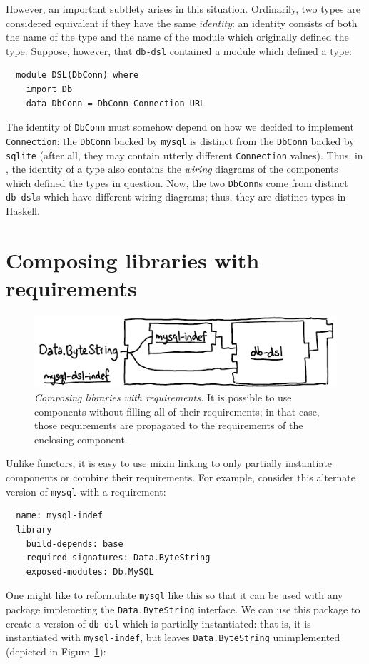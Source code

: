 However, an important subtlety arises in
this situation.  Ordinarily, two types are considered equivalent if they
have the same \emph{identity}: an identity consists of both the name of the
type and the name of the module which originally defined the type.
Suppose, however, that \verb|db-dsl| contained a module which defined
a type:

\begin{verbatim}
  module DSL(DbConn) where
    import Db
    data DbConn = DbConn Connection URL
\end{verbatim}
%
The identity of \verb|DbConn| must somehow depend on how
we decided to implement \verb|Connection|: the \verb|DbConn| backed by
\verb|mysql| is distinct from the \verb|DbConn| backed by \verb|sqlite|
(after all, they may contain utterly different \verb|Connection| values).
Thus, in \Backpack{}, the identity of a type
also contains the \emph{wiring} diagrams of the components which
defined the types in question.  Now, the two \verb|DbConn|s come from
distinct \verb|db-dsl|s which have different wiring diagrams;
thus, they are distinct types in Haskell.

\section{Composing libraries with requirements}

\begin{figure}
\includegraphics{diagrams/composing-requirements.pdf}
\caption{\emph{Composing libraries with requirements.} It is possible
to use components without filling all of their requirements; in that
case, those requirements are propagated to the requirements of the
enclosing component.}
\label{fig:composing-requirements}
\end{figure}

Unlike functors, it is easy to use mixin linking to only partially
instantiate components or combine their requirements.  For example,
consider this alternate version of \verb|mysql| with a requirement:

\begin{verbatim}
  name: mysql-indef
  library
    build-depends: base
    required-signatures: Data.ByteString
    exposed-modules: Db.MySQL
\end{verbatim}
%
One might like to reformulate \verb|mysql| like this so that it can
be used with any package implemeting the \verb|Data.ByteString| interface.
We can use this package to create a version of \verb|db-dsl|
which is partially instantiated: that is, it is instantiated
with \verb|mysql-indef|, but leaves \verb|Data.ByteString|
unimplemented (depicted in Figure~\ref{fig:composing-requirements}):

